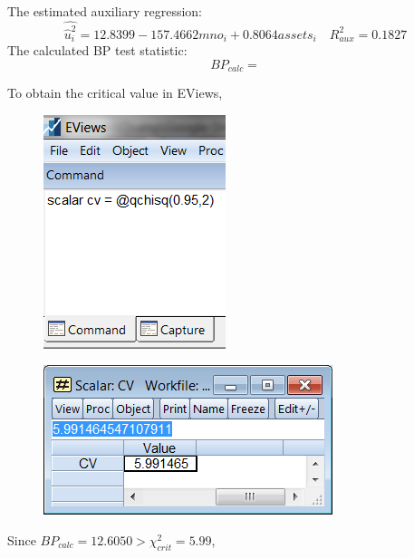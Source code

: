 \documentclass[12pt]{report}
\begin{document}
The estimated auxiliary regression: $$\widehat{\hat{u}^2_i} = 12.8399 - 157.4662 mno_i + 0.8064 assets_i \quad R^2_{aux} = 0.1827$$ The calculated BP test statistic:
$$BP_{calc} = $$

\noindent To obtain the critical value in EViews,
\begin{figure}[H]
	\centering
	\includegraphics{tute10_2}
\end{figure}
\vspace{-\baselineskip}
\begin{figure}[H]
	\centering
	\includegraphics{tute10_3}
\end{figure}
\vspace{-\baselineskip}

\noindent Since $BP_{calc} = 12.6050 > \chi^2_{crit} = 5.99$, 
\end{document}
